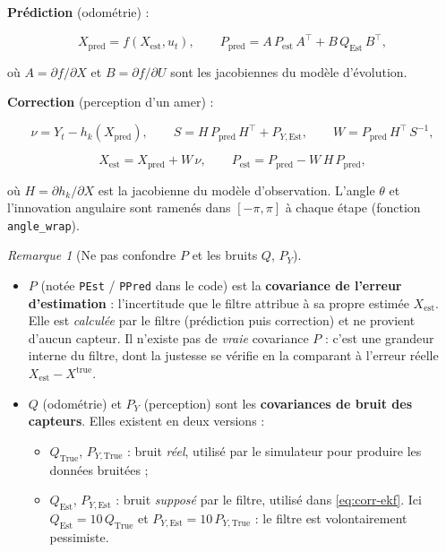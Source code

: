 \documentclass[11pt]{article}
\theoremstyle{remark}
\newtheorem{remark}[theorem]{Remarque}
\theoremstyle{definition}
\begin{document}
\textbf{Pr\'ediction} (odom\'etrie) :

\begin{equation}
X_{\text{pred}} = f(X_{\text{est}}, u_t),
\qquad
P_{\text{pred}} = A\, P_{\text{est}}\, A^\top + B\, Q_{\text{Est}}\, B^\top,
\end{equation}

o\`u $A = \partial f/\partial X$ et $B = \partial f/\partial U$ sont les jacobiennes du mod\`ele
d'\'evolution.

\textbf{Correction} (perception d'un amer) :

\begin{equation}
\nu = Y_t - h_k(X_{\text{pred}}),
\qquad
S = H\, P_{\text{pred}}\, H^\top + P_{Y,\text{Est}},
\qquad
W = P_{\text{pred}}\, H^\top\, S^{-1},
\label{eq:corr-ekf}
\end{equation}

\begin{equation}
X_{\text{est}} = X_{\text{pred}} + W\,\nu,
\qquad
P_{\text{est}} = P_{\text{pred}} - W\,H\,P_{\text{pred}},
\end{equation}

o\`u $H = \partial h_k/\partial X$ est la jacobienne du mod\`ele d'observation. L'angle $\theta$ et
l'innovation angulaire sont ramen\'es dans $[-\pi, \pi]$ \`a chaque \'etape (fonction
\texttt{angle\_wrap}).

\begin{remark}[Ne pas confondre $P$ et les bruits $Q$, $P_Y$]

\begin{itemize}
\item $P$ (not\'ee \texttt{PEst} / \texttt{PPred} dans le code) est la \textbf{covariance de
l'erreur d'estimation} : l'incertitude que le filtre attribue \`a sa propre estim\'ee
$X_{\text{est}}$. Elle est \emph{calcul\'ee} par le filtre (pr\'ediction puis correction) et ne
provient d'aucun capteur. Il n'existe pas de \emph{vraie} covariance $P$ : c'est une grandeur
interne du filtre, dont la justesse se v\'erifie en la comparant \`a l'erreur r\'eelle
$X_{\text{est}} - X^{\text{true}}$.

\item $Q$ (odom\'etrie) et $P_Y$ (perception) sont les \textbf{covariances de bruit des capteurs}.
Elles existent en deux versions :
\begin{itemize}
\item $Q_{\text{True}}$, $P_{Y,\text{True}}$ : bruit \emph{r\'eel}, utilis\'e par le simulateur pour
produire les donn\'ees bruit\'ees ;
\item $Q_{\text{Est}}$, $P_{Y,\text{Est}}$ : bruit \emph{suppos\'e} par le filtre, utilis\'e dans
\eqref{eq:corr-ekf}. Ici $Q_{\text{Est}} = 10\,Q_{\text{True}}$ et
$P_{Y,\text{Est}} = 10\,P_{Y,\text{True}}$ : le filtre est volontairement pessimiste.
\end{itemize}
\end{itemize}
\end{remark}
\end{document}
